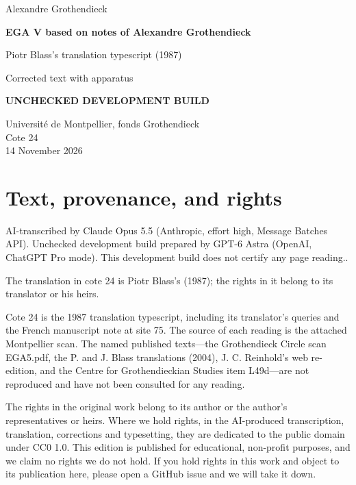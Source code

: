 \documentclass[10pt,a4paper]{article}
\newcommand{\EditionForm}{Corrected text with apparatus}
\begin{document}
\hypersetup{pageanchor=false}\begin{titlepage}\thispagestyle{empty}\vspace*{20mm}
{\Large Alexandre Grothendieck\par}\vspace{12mm}
{\Huge\bfseries EGA V based on notes of Alexandre Grothendieck\par}\vspace{8mm}
{\Large Piotr Blass's translation typescript (1987)\par}\vspace{7mm}
{\large\EditionForm\par}\vspace{12mm}
{\large\bfseries\color{deletedred}UNCHECKED DEVELOPMENT BUILD\par}\vspace{10mm}
Université de Montpellier, fonds Grothendieck\\ Cote 24\\
14 November 2026
\vfill\end{titlepage}\clearpage\hypersetup{pageanchor=true}
\section*{Text, provenance, and rights}
AI-transcribed by Claude Opus 5.5 (Anthropic, effort high, Message Batches API). Unchecked development build prepared by GPT-6 Astra (OpenAI, ChatGPT Pro mode). This development build does not certify any page reading..

The translation in cote 24 is Piotr Blass's (1987); the rights in it belong to its translator or his heirs.

Cote 24 is the 1987 translation typescript, including its translator's queries and the French manuscript note at site 75. The source of each reading is the attached Montpellier scan. The named published texts---the Grothendieck Circle scan EGA5.pdf, the P. and J. Blass translations (2004), J. C. Reinhold's web re-edition, and the Centre for Grothendieckian Studies item L49d---are not reproduced and have not been consulted for any reading.

The rights in the original work belong to its author or the author's representatives or heirs. Where we hold rights, in the AI-produced transcription, translation, corrections and typesetting, they are dedicated to the public domain under CC0 1.0. This edition is published for educational, non-profit purposes, and we claim no rights we do not hold. If you hold rights in this work and object to its publication here, please open a GitHub issue and we will take it down.
\end{document}
